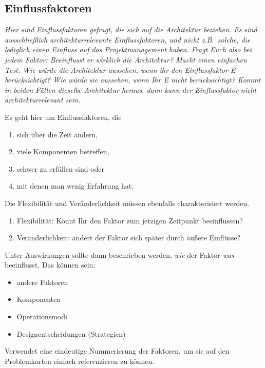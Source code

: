 \documentclass[fontsize=12pt,paper=a4,twoside]{scrartcl}
\begin{document}
\subsection{Einflussfaktoren}
\label{sec:einflussfaktoren}
{\it Hier sind Einflussfaktoren gefragt, die sich auf die Architektur
  beziehen. Es sind ausschließlich architekturrelevante
  Einflussfaktoren, und nicht z.B.\ solche, die lediglich einen
  Einfluss auf das Projektmanagement haben. Fragt Euch also bei jedem
  Faktor: Beeinflusst er wirklich die Architektur? Macht einen
  einfachen Test: Wie würde die Architektur aussehen, wenn ihr den
  Einflussfaktor E berücksichtigt? Wie würde sie aussehen, wenn Ihr E nicht
  berücksichtigt? Kommt in beiden Fällen dieselbe Architektur heraus,
  dann kann der Einflussfaktor nicht architekturrelevant sein.

  Es geht hier um Einflussfaktoren, die
  \begin{enumerate}
  \item sich über die Zeit ändern,
  \item viele Komponenten betreffen,
  \item schwer zu erfüllen sind oder
  \item mit denen man wenig Erfahrung hat.
  \end{enumerate}
  Die Flexibilität und Veränderlichkeit müssen ebenfalls charakterisiert werden. 
  \begin{enumerate}
  \item Flexibilität: Könnt Ihr den Faktor zum jetzigen Zeitpunkt beeinflussen?
  \item Veränderlichkeit: ändert der Faktor sich später durch äußere Einflüsse?
\end{enumerate}

  Unter Auswirkungen sollte dann beschrieben werden, {\em wie} der
  Faktor {\em was} beeinflusst. Das können sein:
  \begin{itemize}
  \item andere Faktoren
  \item Komponenten
  \item Operationsmodi
  \item Designentscheidungen (Strategien)
  \end{itemize}

  Verwendet eine eindeutige Nummerierung der Faktoren, um sie auf den
  Problemkarten einfach referenzieren zu können.  }\\
\end{document}
